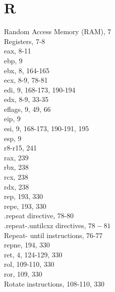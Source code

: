 \documentclass[10pt]{article}
\begin{document}
\section*{R}
Random Access Memory (RAM), 7\\
Registers, 7-8\\
eax, 8-11\\
ebp, 9\\
ebx, 8, 164-165\\
ecx, 8-9, 78-81\\
edi, 9, 168-173, 190-194\\
edx, 8-9, 33-35\\
eflags, 9, 49, 66\\
eip, 9\\
esi, 9, 168-173, 190-191, 195\\
esp, 9\\
r8-r15, 241\\
rax, 239\\
rbx, 238\\
rcx, 238\\
rdx, 238\\
rep, 193, 330\\
repe, 193, 330\\
.repeat directive, 78-80\\
.repeat-.untilcxz directives, $78-81$\\
Repeat- until instructions, 76-77\\
repne, 194, 330\\
ret, 4, 124-129, 330\\
rol, 109-110, 330\\
ror, 109, 330\\
Rotate instructions, 108-110, 330
\end{document}
